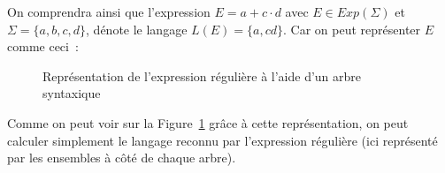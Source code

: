 \begin{example}
    On comprendra ainsi que l'expression \(E = a+c \cdot d\) avec \(E \in
    Exp(\Sigma)\) et \(\Sigma = \{a, b, c, d\}\), dénote le langage
    \(L(E) = \{a, cd\}\). Car on peut représenter \(E\) comme ceci~:

    \begin{figure}[H]
        \centering
        \captionsetup{type=figure,justification=centering}
        \caption{
            Représentation de l'expression régulière à l'aide d'un arbre syntaxique
        }\label{fig:arbre_syn}
    \end{figure}

    Comme on peut voir sur la Figure~\ref{fig:arbre_syn} grâce à cette
    représentation, on peut calculer simplement le langage reconnu par l'expression
    régulière (ici représenté par les ensembles à c\^{o}té de chaque arbre).
\end{example}





